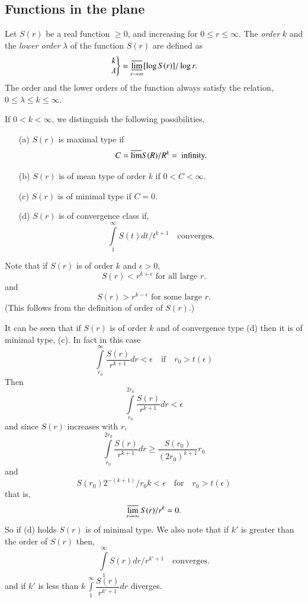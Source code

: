 \subsection{Functions in the plane}\label{part1-sec1.7}\pageoriginale

Let $S(r)$ be a real function $\geq 0$, and increasing for $0\leq
r\leq \infty$. The {\em order} $k$ and the {\em lower order} $\lambda$
of the function $S(r)$ are defined as
\begin{equation*}
\left.
\begin{matrix}
k\\
\lambda
\end{matrix}\right\}
=\mathop{\overline{\underline{\lim}}}_{r\to \infty}[\log S(r)]/\log r.
\end{equation*}
The order and the lower orders of the function always satisfy the
relation, $0\leq \lambda\leq k\leq \infty$.

If $0<k<\infty$, we distinguish the following possibilities,
\begin{itemize}
\item[(a)] $S(r)$ is maximal type if
$$
C=\overline{\lim}S(R)/R^{k}=\text{ infinity.}
$$

\item[(b)] $S(r)$ is of mean type of order $k$ if $0<C<\infty$.

\item[(c)] $S(r)$ is of minimal type if $C=0$.

\item[(d)] $S(r)$ is of convergence class if,
$$
\int\limits^{\infty}_{1}S(t)dt/t^{k+1}\quad \text{converges}.
$$
\end{itemize}
Note that if $S(r)$ is of order $k$ and $\epsilon>0$,
$$
S(r)<r^{k+\epsilon}\text{ \ for all large \ } r.
$$
and
$$
S(r)>r^{k-\epsilon} \text{ \ for some large \ } r.
$$
(This follows from the definition of order of $S(r)$.)

It can be seen that if $S(r)$ is of order $k$ and of convergence type
\iec (d) then it is of minimal type, (c). In fact in this case 
$$
\int\limits^{\infty}_{r_{0}}\frac{S(r)}{r^{k+1}}dr<\epsilon\quad\text{if}\quad
r_{0}>t(\epsilon)
$$\pageoriginale
Then 
$$
\int\limits^{2r_{0}}_{r_{0}}\frac{S(r)}{r^{k+1}}dr<\epsilon
$$
and since $S(r)$ increases with $r$,
$$
\int\limits^{2r_{0}}_{r_{0}}\frac{S(r)}{r^{k+1}}dr\geq
\frac{S(r_{0})}{(2r_{0})^{k+1}}r_{0}
$$
and
$$
S(r_{0})2^{-(k+1)}/r_{0}k<\epsilon\quad\text{for}\quad
r_{0}>t(\epsilon)
$$
that is,
$$
\mathop{\overline{\lim}}\limits_{r\to\infty} S(r)/r^{k}=0.
$$
So if (d) holds $S(r)$ is of minimal type. We also note that if $k'$
is greater than the order of $S(r)$ then,
$$
\int\limits^{\infty}_{1}S(r)dr/r^{k'+1}\quad\text{converges.}
$$
and if $k'$ is less than
$k\,\int\limits^{\infty}_{1}\dfrac{S(r)}{r^{k'+1}}dr$ diverges.

